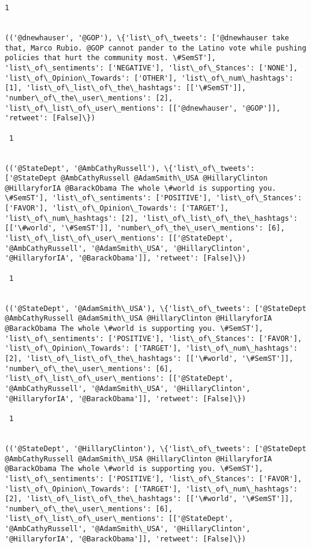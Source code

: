 \documentclass[11pt]{article}
\begin{document}
\begin{Verbatim}[commandchars=\\\{\}]
 1
 

(('@dnewhauser', '@GOP'), \{'list\_of\_tweets': ['@dnewhauser take that, Marco Rubio. @GOP cannot pander to the Latino vote while pushing policies that hurt the community most. \#SemST'], 'list\_of\_sentiments': ['NEGATIVE'], 'list\_of\_Stances': ['NONE'], 'list\_of\_Opinion\_Towards': ['OTHER'], 'list\_of\_num\_hashtags': [1], 'list\_of\_list\_of\_the\_hashtags': [['\#SemST']], 'number\_of\_the\_user\_mentions': [2], 'list\_of\_list\_of\_user\_mentions': [['@dnewhauser', '@GOP']], 'retweet': [False]\})

 1
 

(('@StateDept', '@AmbCathyRussell'), \{'list\_of\_tweets': ['@StateDept @AmbCathyRussell @AdamSmith\_USA @HillaryClinton @HillaryforIA @BarackObama The whole \#world is supporting you. \#SemST'], 'list\_of\_sentiments': ['POSITIVE'], 'list\_of\_Stances': ['FAVOR'], 'list\_of\_Opinion\_Towards': ['TARGET'], 'list\_of\_num\_hashtags': [2], 'list\_of\_list\_of\_the\_hashtags': [['\#world', '\#SemST']], 'number\_of\_the\_user\_mentions': [6], 'list\_of\_list\_of\_user\_mentions': [['@StateDept', '@AmbCathyRussell', '@AdamSmith\_USA', '@HillaryClinton', '@HillaryforIA', '@BarackObama']], 'retweet': [False]\})

 1
 

(('@StateDept', '@AdamSmith\_USA'), \{'list\_of\_tweets': ['@StateDept @AmbCathyRussell @AdamSmith\_USA @HillaryClinton @HillaryforIA @BarackObama The whole \#world is supporting you. \#SemST'], 'list\_of\_sentiments': ['POSITIVE'], 'list\_of\_Stances': ['FAVOR'], 'list\_of\_Opinion\_Towards': ['TARGET'], 'list\_of\_num\_hashtags': [2], 'list\_of\_list\_of\_the\_hashtags': [['\#world', '\#SemST']], 'number\_of\_the\_user\_mentions': [6], 'list\_of\_list\_of\_user\_mentions': [['@StateDept', '@AmbCathyRussell', '@AdamSmith\_USA', '@HillaryClinton', '@HillaryforIA', '@BarackObama']], 'retweet': [False]\})

 1
 

(('@StateDept', '@HillaryClinton'), \{'list\_of\_tweets': ['@StateDept @AmbCathyRussell @AdamSmith\_USA @HillaryClinton @HillaryforIA @BarackObama The whole \#world is supporting you. \#SemST'], 'list\_of\_sentiments': ['POSITIVE'], 'list\_of\_Stances': ['FAVOR'], 'list\_of\_Opinion\_Towards': ['TARGET'], 'list\_of\_num\_hashtags': [2], 'list\_of\_list\_of\_the\_hashtags': [['\#world', '\#SemST']], 'number\_of\_the\_user\_mentions': [6], 'list\_of\_list\_of\_user\_mentions': [['@StateDept', '@AmbCathyRussell', '@AdamSmith\_USA', '@HillaryClinton', '@HillaryforIA', '@BarackObama']], 'retweet': [False]\})


\end{Verbatim}
\end{document}
